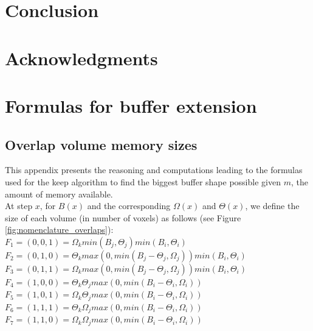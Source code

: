 \documentclass[conference]{IEEEtran}
\begin{document}
\section{Conclusion}

\section{Acknowledgments}




\appendices

  \section{Formulas for buffer extension}
  \label{FormulasKeep}

  \subsection{Overlap volume memory sizes}
  This appendix presents the reasoning and computations leading to the formulas used for the keep algorithm to find the biggest buffer shape possible given $m$, the amount of memory available. \\

  At step $x$, for $B(x)$ and the corresponding $\Omega(x)$ and $\Theta(x)$, we define the size of each volume (in number of voxels) as follows (see Figure \ref{fig:nomenclature_overlaps}): \\
  $F_1 = (0,0,1) = \Omega_k min(B_j, \Theta_j) min(B_i, \Theta_i)$ \\
  $F_2 = (0,1,0) = \Theta_k max(0, min(B_j - \Theta_j, \Omega_j)) min(B_i, \Theta_i)$ \\
  $F_3 = (0,1,1) = \Omega_k max(0, min(B_j - \Theta_j, \Omega_j)) min(B_i, \Theta_i)$ \\
  $F_4 = (1,0,0) = \Theta_k \Theta_j max(0, min(B_i-\Theta_i, \Omega_i))$ \\
  $F_5 = (1,0,1) = \Omega_k \Theta_j max(0, min(B_i-\Theta_i, \Omega_i))$ \\
  $F_6 = (1,1,1) = \Theta_k \Omega_j max(0, min(B_i-\Theta_i, \Omega_i))$ \\
  $F_7 = (1,1,0) = \Omega_k \Omega_j max(0, min(B_i-\Theta_i, \Omega_i))$ \\
\end{document}
